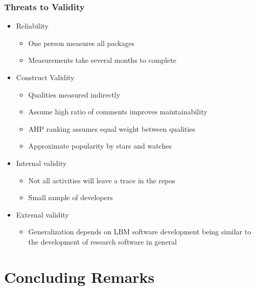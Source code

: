 \documentclass[usenames,dvipsnames]{beamer}
\begin{document}
\begin{frame}

  \frametitle{Threats to Validity}
  
  \begin{itemize}
    \item Reliability
    \begin{itemize}
      \item One person measures all packages
      \item Measurements take several months to complete
    \end{itemize}
    \item Construct Validity
    \begin{itemize}
      \item Qualities measured indirectly
      \item Assume high ratio of comments improves maintainability
      \item AHP ranking assumes equal weight between qualities
      \item Approximate popularity by stars and watches
    \end{itemize}
    \item Internal validity
    \begin{itemize}
      \item Not all activities will leave a trace in the repos
      \item Small sample of developers
    \end{itemize}
    \item External validity
    \begin{itemize}
      \item Generalization depends on LBM software development being similar to
      the development of research software in general
    \end{itemize}
  \end{itemize}

\end{frame}
  

\section[Conclusion]{Concluding Remarks}

\end{document}
